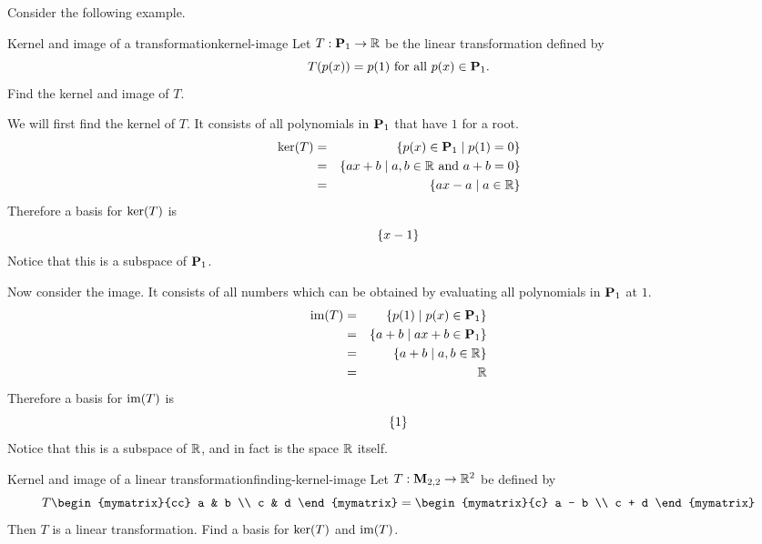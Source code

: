 Consider the following example.

\begin{example}{Kernel and image of a transformation}{kernel-image}
Let $T:\mathbf{P}_1\to\mathbb{R}$ be the linear transformation defined by
\[ T(p(x))=p(1)\mbox{ for all } p(x)\in \mathbf{P}_1.\]
Find the kernel and image of $T$.
\end{example}

\begin{solution}
We will first find the kernel of $T$. It consists of all polynomials in $\mathbf{P}_1$ that have $1$ for a root.
\begin{eqnarray*}
\mbox{\rm ker}(T) & = & \left\{p(x)\in \mathbf{P}_1 \mid p(1)=0\right\} \\
& = & \left\{ax+b \mid a,b\in\mathbb{R} \mbox{ and }a+b=0\right\} \\
& = & \left\{ax-a \mid a\in\mathbb{R}\right\}
\end{eqnarray*}
Therefore a basis for $\mbox{\rm ker}(T)$ is
\[
\left\{x-1 \right\}
\]
Notice that this is a subspace of $\mathbf{P}_1$.

Now consider the image. It consists of all numbers which can be obtained by evaluating all polynomials in $\mathbf{P}_1$ at $1$.
\begin{eqnarray*}
\mbox{\rm im}(T) & = & \left\{p(1) \mid p(x)\in \mathbf{P}_1\right\} \\
 & = & \left\{a+b \mid ax+b\in \mathbf{P}_1\right\} \\
 & = & \left\{a+b \mid a,b\in\mathbb{R}\right\}\\
 & = & \mathbb{R}
\end{eqnarray*}
Therefore a basis for $\mbox{\rm im}(T)$ is
\[
\left\{1 \right\}
\]
Notice that this is a subspace of $\mathbb{R}$, and in fact is the space $\mathbb{R}$ itself.
\end{solution}

\begin{example}{Kernel and image of a linear transformation}{finding-kernel-image}
Let $T: \mathbf{M}_{2,2} \to \mathbb{R}^2$ be defined by
\[
T \begin{mymatrix}{cc}
a & b \\
c & d
\end{mymatrix}
 =
\begin{mymatrix}{c}
a - b \\
c + d
\end{mymatrix}
\]
Then $T$ is a linear transformation. Find a basis for $\mbox{\rm ker} (T)$ and $\mbox{\rm im}(T)$.
\end{example}

